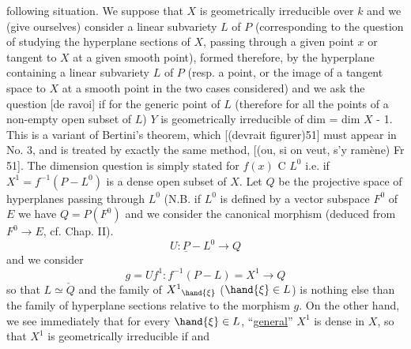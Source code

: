 
following situation.  We suppose that $X$ is geometrically
irreducible over $k$ and we (give ourselves) consider a linear
subvariety $L$ of $P$ (corresponding to the question of studying the
hyperplane sections of $X$, passing through a given point $x$ or
tangent to $X$ at a given smooth point), formed therefore, by the
hyperplane containing a linear subvariety $L$ of $P$ (resp. a point,
or the image of a tangent space to $X$ at a smooth point in the two
cases considered) and we ask the question [de ravoi] if for the
generic point of $L$ (therefore for all the points of a non-empty
open subset of $L$) $Y$ is geometrically irreducible of dim = dim $X$ -
1.  This is a variant of Bertini's theorem, which [(devrait
figurer)51] must appear in No. 3, and is treated by exactly the
same method, [(ou, si on veut, s'y ramène) Fr 51].  The dimension
question is simply stated for $f(x)$ C $L^0$ i.e. if $X^1 = f^{-1}(P - L^0)$ is
a dense open subset of $X$.  Let $Q$ be the projective space of
hyperplanes passing through $L^0$ (N.B. if $L^0$ is defined by a vector
subspace $F^0$ of $E$ we have $Q = P(F^0)$ and we consider the canonical
morphism (deduced from $F^0 \to E$, cf.  Chap. II).
\[ U : \underline{P} - L^0 \to Q \]
and we consider
\[ g = Uf^1 : f^{-1}(P - L) = X^1 \to Q \]
so that $L \simeq \check{Q}$ and the family of $X^1{}_{\hand{\xi}}$ ($\hand{\xi} \in L$) is nothing else than
the family of hyperplane sections relative to the morphism $g$.  On
the other hand, we see immediately that for every $\hand{\xi}\in L$, ``\uline{general}''
$X^1$ is dense in $X$, so that $X^1$ is geometrically irreducible if and
